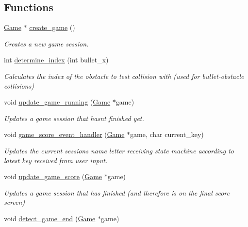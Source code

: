 \subsection*{Functions}
\begin{DoxyCompactItemize}
\item 
\hyperlink{struct_game}{Game} $\ast$ \hyperlink{group__game_gaabb10419dbd089ed1f572a817bea10ee}{create\+\_\+game} ()
\begin{DoxyCompactList}\small\item\em Creates a new game session. \end{DoxyCompactList}\item 
int \hyperlink{group__game_ga419536b6c803dd698c45680932477690}{determine\+\_\+index} (int bullet\+\_\+x)
\begin{DoxyCompactList}\small\item\em Calculates the index of the obstacle to test collision with (used for bullet-\/obstacle collisions) \end{DoxyCompactList}\item 
void \hyperlink{group__game_gaf0f9fdea8b3749557a89193e12153e1e}{update\+\_\+game\+\_\+running} (\hyperlink{struct_game}{Game} $\ast$game)
\begin{DoxyCompactList}\small\item\em Updates a game session that hasn\textquotesingle{}t finished yet. \end{DoxyCompactList}\item 
void \hyperlink{group__game_gaae19b3df5cdf51786306772dc362cc78}{game\+\_\+score\+\_\+event\+\_\+handler} (\hyperlink{struct_game}{Game} $\ast$game, char current\+\_\+key)
\begin{DoxyCompactList}\small\item\em Updates the current session\textquotesingle{}s name letter receiving state machine according to latest key received from user input. \end{DoxyCompactList}\item 
void \hyperlink{group__game_ga7fb225326dc8e9874c6ae3ac8b92e590}{update\+\_\+game\+\_\+score} (\hyperlink{struct_game}{Game} $\ast$game)
\begin{DoxyCompactList}\small\item\em Updates a game session that has finished (and therefore is on the final score screen) \end{DoxyCompactList}\item 
void \hyperlink{group__game_ga6d509d99fcf7deead2ccb896bfce5b78}{detect\+\_\+game\+\_\+end} (\hyperlink{struct_game}{Game} $\ast$game)

\end{DoxyCompactItemize}
